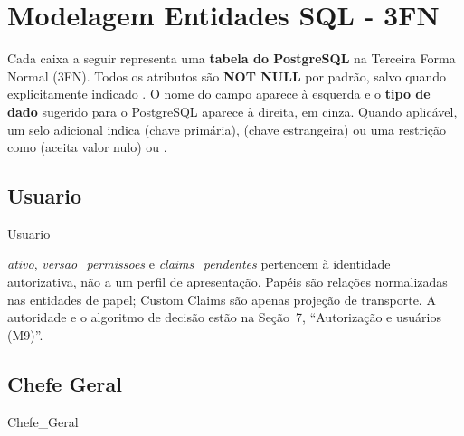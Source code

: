 \section{Modelagem Entidades SQL - 3FN}\label{sec:modelagem}

\begin{explicacao}
Cada caixa a seguir representa uma \textbf{tabela do PostgreSQL} na Terceira Forma Normal (3FN). Todos os atributos são \textbf{NOT NULL} por padrão, salvo quando explicitamente indicado . O nome do campo aparece à esquerda e o \textbf{tipo de dado} sugerido para o PostgreSQL aparece à direita, em cinza. Quando aplicável, um selo adicional indica  (chave primária),  (chave estrangeira) ou uma restrição como  (aceita valor nulo) ou .
\end{explicacao}

\subsection{Usuario}
\begin{entidade}{Usuario}
\end{entidade}
\begin{regra}
\textit{ativo}, \textit{versao\_permissoes} e \textit{claims\_pendentes} pertencem à
identidade autorizativa, não a um perfil de apresentação. Papéis são relações
normalizadas nas entidades de papel; Custom Claims são apenas projeção de
transporte. A autoridade e o algoritmo de decisão estão na Seção~7,
``Autorização e usuários (M9)''.
\end{regra}

\subsection{Chefe Geral}
\begin{entidade}{Chefe\_Geral}
\end{entidade}

